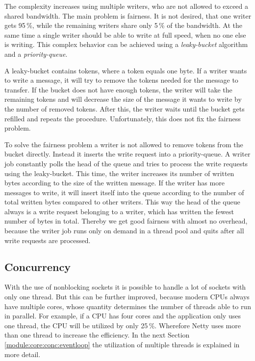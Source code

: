 The complexity increases using multiple writers, who are not allowed to exceed a shared bandwidth. The main problem is fairness. It is not desired, that one writer gets 95\,\%, while the remaining writers share only 5\,\% of the bandwidth. At the same time a single writer should be able to write at full speed, when no one else is writing. This complex behavior can be achieved using a \emph{leaky-bucket} algorithm and a \emph{priority-queue}.

A leaky-bucket contains tokens, where a token equals one byte. If a writer wants to write a message, it will try to remove the tokens needed for the message to transfer. If the bucket does not have enough tokens, the writer will take the remaining tokens and will decrease the size of the message it wants to write by the number of removed tokens. After this, the writer waits until the bucket gets refilled and repeats the procedure. Unfortunately, this does not fix the fairness problem.

To solve the fairness problem a writer is not allowed to remove tokens from the bucket directly. Instead it inserts the write request into a priority-queue. A writer job constantly polls the head of the queue and tries to process the write requests using the leaky-bucket. This time, the writer increases its number of written bytes according to the size of the written message. If the writer has more messages to write, it will insert itself into the queue according to the number of total written bytes compared to other writers. This way the head of the queue always is a write request belonging to a writer, which has written the fewest number of bytes in total. Thereby we get good fairness with almost no overhead, because the writer job runs only on demand in a thread pool and quits after all write requests are processed.


\subsection{Concurrency}
With the use of nonblocking sockets it is possible to handle a lot of sockets with only one thread. But this can be further improved, because modern CPUs always have multiple cores, whose quantity determines the number of threads able to run in parallel. For example, if a CPU has four cores and the application only uses one thread, the CPU will be utilized by only 25\,\%. Wherefore Netty uses more than one thread to increase the efficiency. In the next Section \ref{module:core:conc:eventloop} the utilization of multiple threads is explained in more detail.

